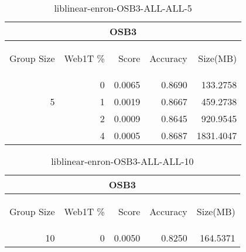 \begin{center}
\begin{table}[htbp]
\begin{tabular}{ | r | r | r | r | r |}
\hline
\multicolumn{5}{|c|}{OSB3}\\
\hline
\begin{sideways}Group Size\end{sideways} & \begin{sideways}Web1T \%\end{sideways} & \begin{sideways}Score\end{sideways} & \begin{sideways}Accuracy\end{sideways} & \begin{sideways}Size(MB)\end{sideways}\\
\hline
\multirow{3}{*}{5}
 & 0 & 0.0065 & 0.8690 & 133.2758\\ \cline{2-5}
 & 1 & 0.0019 & 0.8667 & 459.2738\\ \cline{2-5}
 & 2 & 0.0009 & 0.8645 & 920.9545\\ \cline{2-5}
 & 4 & 0.0005 & 0.8687 & 1831.4047\\ \cline{2-5}
\hline
\end{tabular}
\caption{liblinear-enron-OSB3-ALL-ALL-5}
\label{table:liblinear-enron-OSB3-ALL-ALL-5}
\end{table}
\end{center}

\begin{center}
\begin{table}[htbp]
\begin{tabular}{ | r | r | r | r | r |}
\hline
\multicolumn{5}{|c|}{OSB3}\\
\hline
\begin{sideways}Group Size\end{sideways} & \begin{sideways}Web1T \%\end{sideways} & \begin{sideways}Score\end{sideways} & \begin{sideways}Accuracy\end{sideways} & \begin{sideways}Size(MB)\end{sideways}\\
\hline
\multirow{0}{*}{10}
 & 0 & 0.0050 & 0.8250 & 164.5371\\ \cline{2-5}
\hline
\end{tabular}
\caption{liblinear-enron-OSB3-ALL-ALL-10}
\label{table:liblinear-enron-OSB3-ALL-ALL-10}
\end{table}
\end{center}


